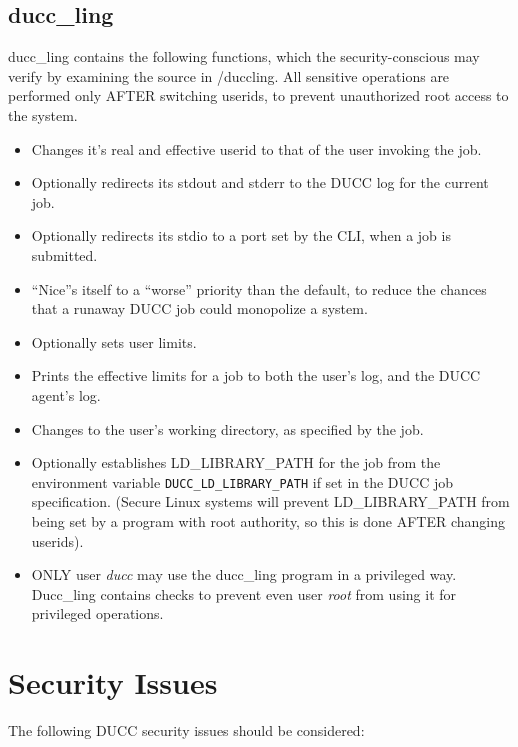     \subsection{ducc\_ling}   
    \label{sec:duccling.security}
           ducc\_ling contains the following functions, which the security-conscious may verify by examining
       the source in \duccruntime/duccling.  All sensitive operations are performed only AFTER switching
       userids, to prevent unauthorized root access to the system.
       \begin{itemize}
         \item Changes it's real and effective userid to that of the user invoking the job.
         \item Optionally redirects its stdout and stderr to the DUCC log for the current job.
         \item Optionally redirects its stdio to a port set by the CLI, when a job is submitted.
         \item ``Nice''s itself to a ``worse'' priority than the default, to reduce the chances
           that a runaway DUCC job could monopolize a system.
         \item Optionally sets user limits.
         \item Prints the effective limits for a job to both the user's log, and the DUCC agent's log.
         \item Changes to the user's working directory, as specified by the job.
         \item Optionally establishes LD\_LIBRARY\_PATH 
           for the job from the environment variable  {\tt DUCC\_LD\_LIBRARY\_PATH}
           if set in the DUCC job specification. (Secure Linux systems will
           prevent LD\_LIBRARY\_PATH 
           from being set by a program with root authority, so this is
           done AFTER changing userids).
         \item  ONLY user {\em ducc} may use the ducc\_ling program in
           a privileged way. Ducc\_ling contains checks to prevent even user {\em root} from using it for
           privileged operations. 

       \end{itemize}
    
    
    \section{Security Issues}
    The following DUCC security issues should be considered:
    
